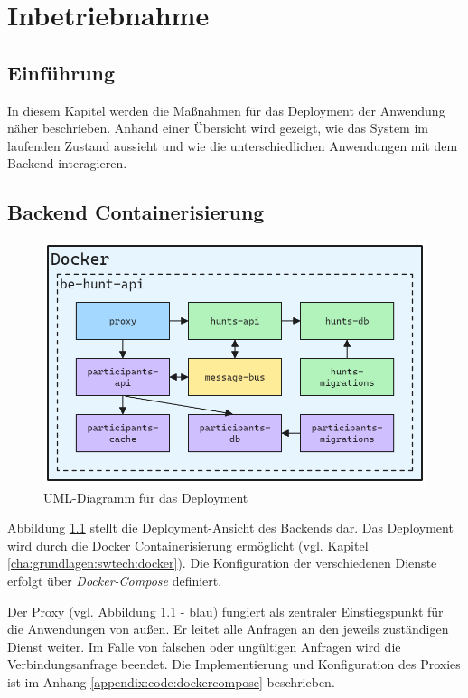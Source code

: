 \chapter{Inbetriebnahme} \label{cha:inbetriebnahme}

\section{Einführung}

In diesem Kapitel werden die Maßnahmen für das Deployment der Anwendung näher beschrieben. Anhand einer Übersicht wird gezeigt, wie das System im laufenden Zustand aussieht und wie die unterschiedlichen Anwendungen mit dem Backend interagieren.

\section{Backend Containerisierung}

\begin{figure}[H]
  \centering
  \includegraphics[width=\textwidth]{images/PrAr_Depl_Docker.png}
  \caption{UML-Diagramm für das Deployment}
  \label{fig:deployment:docker}
\end{figure}

Abbildung \ref{fig:deployment:docker} stellt die Deployment-Ansicht des Backends dar. Das Deployment wird durch die Docker Containerisierung ermöglicht (vgl. Kapitel \ref{cha:grundlagen:swtech:docker}). Die Konfiguration der verschiedenen Dienste erfolgt über \textit{Docker-Compose} definiert.

Der Proxy (vgl. Abbildung \ref{fig:deployment:docker} - blau) fungiert als zentraler Einstiegspunkt für die Anwendungen von außen. Er leitet alle Anfragen an den jeweils zuständigen Dienst weiter. Im Falle von falschen oder ungültigen Anfragen wird die Verbindungsanfrage beendet. Die Implementierung und Konfiguration des Proxies ist im Anhang \ref{appendix:code:dockercompose} beschrieben.

